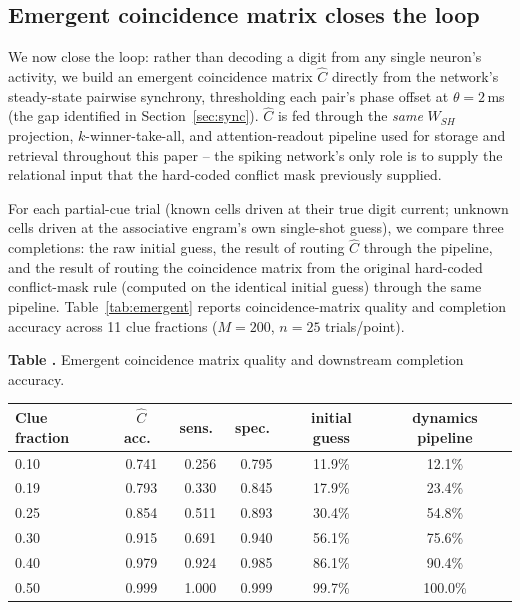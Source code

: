 \documentclass[11pt]{article}
\newcommand{\toprule}{\hline\hline}
\newcommand{\midrule}{\hline}
\newcommand{\bottomrule}{\hline\hline}
\begin{document}
\subsection{Emergent coincidence matrix closes the loop}
\label{sec:emergent}

We now close the loop: rather than decoding a digit from any single neuron's activity, we
build an emergent coincidence matrix $\hat C$ directly from the network's steady-state
pairwise synchrony, thresholding each pair's phase offset at $\theta=2$\,ms (the gap
identified in Section~\ref{sec:sync}). $\hat C$ is fed through the \emph{same} $W_{SH}$
projection, $k$-winner-take-all, and attention-readout pipeline used for storage and
retrieval throughout this paper -- the spiking network's only role is to supply the
relational input that the hard-coded conflict mask previously supplied.

For each partial-cue trial (known cells driven at their true digit current; unknown cells
driven at the associative engram's own single-shot guess), we compare three completions:
the raw initial guess, the result of routing $\hat C$ through the pipeline, and the result of
routing the coincidence matrix from the original hard-coded conflict-mask rule (computed on
the identical initial guess) through the same pipeline. Table~\ref{tab:emergent} reports
coincidence-matrix quality and completion accuracy across 11 clue fractions ($M=200$, $n=25$
trials/point).

\label{tab:emergent}
\noindent\textbf{Table \thetable.} Emergent coincidence matrix quality and downstream completion accuracy.
\begin{center}
\begin{tabular}{lccccc}
\toprule
Clue fraction & $\hat C$ acc.\ & sens.\ & spec.\ & initial guess & dynamics pipeline \\
\midrule
0.10 & 0.741 & 0.256 & 0.795 & 11.9\% & 12.1\% \\
0.19 & 0.793 & 0.330 & 0.845 & 17.9\% & 23.4\% \\
0.25 & 0.854 & 0.511 & 0.893 & 30.4\% & 54.8\% \\
0.30 & 0.915 & 0.691 & 0.940 & 56.1\% & 75.6\% \\
0.40 & 0.979 & 0.924 & 0.985 & 86.1\% & 90.4\% \\
0.50 & 0.999 & 1.000 & 0.999 & 99.7\% & 100.0\% \\
\bottomrule
\end{tabular}
\end{center}
\end{document}
